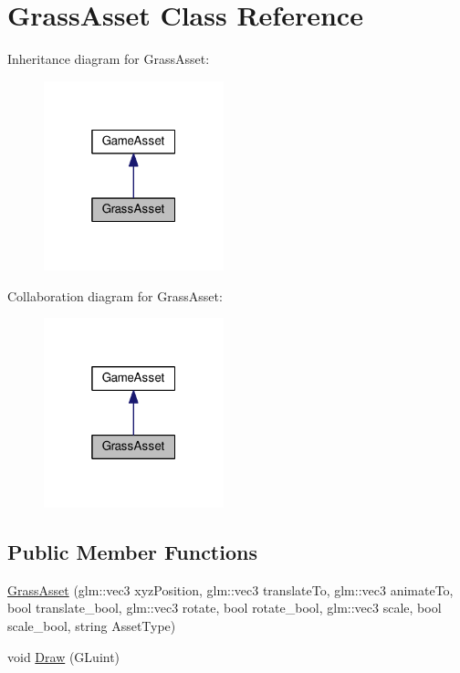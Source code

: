 \hypertarget{class_grass_asset}{}\section{Grass\+Asset Class Reference}
\label{class_grass_asset}


Inheritance diagram for Grass\+Asset\+:
\nopagebreak
\begin{figure}[H]
\begin{center}
\leavevmode
\includegraphics[width=148pt]{class_grass_asset__inherit__graph}
\end{center}
\end{figure}


Collaboration diagram for Grass\+Asset\+:
\nopagebreak
\begin{figure}[H]
\begin{center}
\leavevmode
\includegraphics[width=148pt]{class_grass_asset__coll__graph}
\end{center}
\end{figure}
\subsection*{Public Member Functions}
\begin{DoxyCompactItemize}
\item 
\hyperlink{class_grass_asset_a6dd2fdfec9aa1396282f0711912b5740}{Grass\+Asset} (glm\+::vec3 xyz\+Position, glm\+::vec3 translate\+To, glm\+::vec3 animate\+To, bool translate\+\_\+bool, glm\+::vec3 rotate, bool rotate\+\_\+bool, glm\+::vec3 scale, bool scale\+\_\+bool, string Asset\+Type)
\item 
void \hyperlink{class_grass_asset_a0178a72c5bf2f00bcc6a240b851f3a25}{Draw} (G\+Luint)
\end{DoxyCompactItemize}


